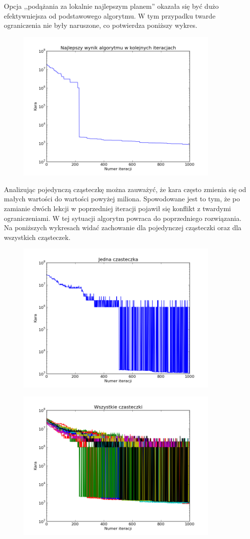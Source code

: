 \par Opcja ,,podążania za lokalnie najlepszym planem'' okazała się być dużo efektywniejsza od podstawowego algorytmu. W tym przypadku twarde ograniczenia nie były naruszone, co potwierdza poniższy wykres.
\begin{figure}[H]
\includegraphics[width=10cm]{img/localbest_penalty.png}
\centering
\end{figure}
\par Analizując pojedynczą cząsteczkę można zauważyć, że kara często zmienia się od małych wartości do wartości powyżej miliona. Spowodowane jest to tym, że po zamianie dwóch lekcji w poprzedniej iteracji pojawił się konflikt z twardymi ograniczeniami. W tej sytuacji algorytm powraca do poprzedniego rozwiązania. Na poniższych wykresach widać zachowanie dla pojedynczej cząsteczki oraz dla wszystkich cząsteczek.
\begin{figure}[H]
\includegraphics[width=10cm]{img/localbest_particle.png}
\centering
\end{figure}
\begin{figure}[H]
\includegraphics[width=10cm]{img/localbest_particle_all.png}
\centering
\end{figure}
